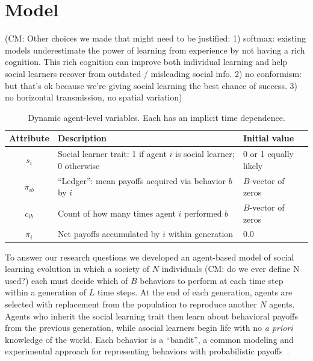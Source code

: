 \documentclass[letterpaper,11.5pt]{scrartcl}
\newcommand{\cm}[1]{{\textcolor{mypurple} {({\tiny CM:} #1)}}}
\begin{document}
\section{Model}

\cm{Other choices we made that might need to be justified: 1) softmax: existing models underestimate the power of learning from experience by not having a rich cognition. This rich cognition can improve both individual learning and help social learners recover from outdated / misleading social info. 2) no conformism: but that's ok because we're giving social learning the best chance of success. 3) no horizontal transmission, no spatial variation}

\begin{table}[h]
    \caption{Dynamic agent-level variables. Each has an implicit time dependence.}
    \label{tab:modelParameters}
    \centering %
    \begin{tabular}{cp{4.0in}p{1.25in}} \toprule

        Attribute & Description & Initial value \\ 

        \midrule  

        $s_i$  & Social learner trait: 1 if agent $i$ is social learner; 0 otherwise & 0
        or 1 equally likely \\

        $\bar\pi_{ib}$ & ``Ledger'': mean payoffs acquired via behavior $b$ by $i$ 
                       & $B$-vector of zeros \\

        $c_{ib}$ & Count of how many times agent $i$ performed $b$ 
              & $B$-vector of zeros \\

        $\pi_i$ & Net payoffs accumulated by $i$ within generation
                                & 0.0 \\
        \bottomrule
    \end{tabular}
\end{table}

To answer our research questions we developed an agent-based model of social
learning evolution in which a society of $N$ individuals \cm{do we ever define N used?} each must decide which of
$B$ behaviors to perform at each time step within a generation of $L$ time steps. At
the end of each generation, agents are selected with replacement from the population
to reproduce another $N$ agents. Agents who inherit the social learning trait then
learn about behavioral payoffs from the previous generation, while asocial learners
begin life with no \emph{a priori} knowledge of the world.  Each behavior is a
``bandit'', a common modeling and experimental approach for representing behaviors
with probabilistic
payoffs~\cite{SuttonBartoBook,McElreath2005,Steyvers2009,Rendell2010,Schulz2019}. 
\end{document}
